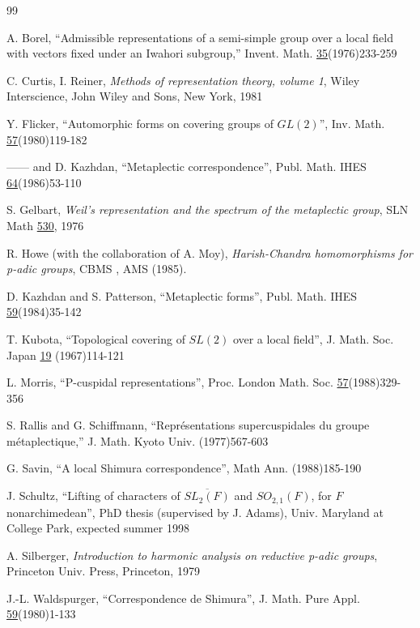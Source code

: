 \begin{thebibliography}{99}

 A. Borel, ``Admissible representations of 
a semi-simple group
over a local field with vectors fixed under an Iwahori 
subgroup,'' Invent. Math. \underline{35}(1976)233-259

 C. Curtis, I. Reiner, {\it Methods 
of representation theory, volume 1}, Wiley Interscience, 
John Wiley and Sons,
New York, 1981

 Y. Flicker, ``Automorphic forms on covering groups of 
$GL(2)$'', Inv. Math. \underline{57}(1980)119-182

 ------ and D. Kazhdan, ``Metaplectic 
correspondence'', Publ. Math. IHES \underline{64}(1986)53-110

 S. Gelbart, {\it Weil's representation and 
the spectrum of the metaplectic group},
SLN Math \underline{530}, 1976

 R. Howe (with the collaboration of A. Moy),
{\it Harish-Chandra homomorphisms for p-adic groups}, 
CBMS , AMS (1985).


 D. Kazhdan and  S. Patterson, ``Metaplectic forms'', 
Publ. Math. IHES \underline{59}(1984)35-142

 T. Kubota, ``Topological covering of $SL(2)$ over a 
local field'', J.
Math. Soc. Japan \underline{19} (1967)114-121


 L. Morris, ``P-cuspidal representations'', 
Proc. London Math. Soc. \underline{57}(1988)329-356

 S. Rallis and G. Schiffmann,
``Repr\'esentations supercuspidales du
groupe m\'etaplectique,'' J. Math. Kyoto
Univ. (1977)567-603

 G. Savin, ``A local Shimura correspondence'',
Math Ann. (1988)185-190

 J. Schultz, ``Lifting of characters of 
$\overline{SL_2(F)}$ and
$SO_{2,1}(F)$, for $F$ nonarchimedean'',
PhD thesis (supervised by J. Adams),
Univ. Maryland at College Park, expected summer 1998

 A. Silberger, {\it Introduction to
harmonic analysis on reductive p-adic groups}, Princeton Univ. 
Press, Princeton, 1979

 J.-L. Waldspurger, ``Correspondence de Shimura'',
J. Math. Pure Appl. \underline{59}(1980)1-133
\end{thebibliography}


